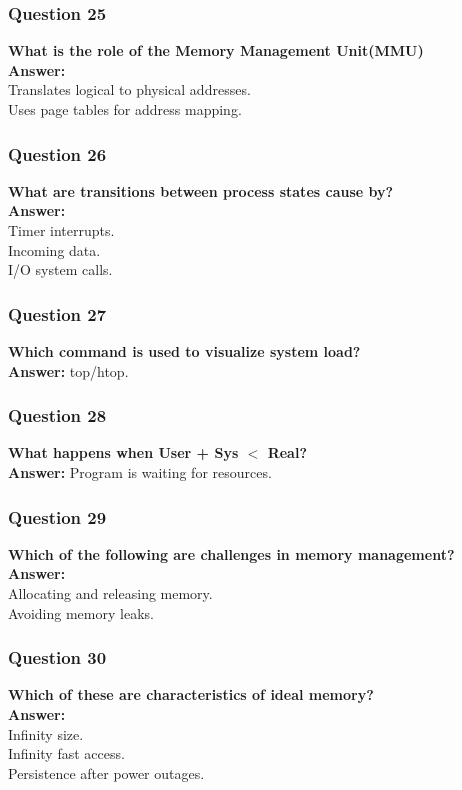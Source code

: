 \documentclass{article}
\begin{document}
\subsubsection*{Question 25}
\textbf{What is the role of the Memory Management Unit(MMU)} \\
\textbf{Answer:} \\ 
Translates logical to physical addresses. \\
Uses page tables for address mapping.

\subsubsection*{Question 26}
\textbf{What are transitions between process states cause by?} \\
\textbf{Answer:} \\
Timer interrupts. \\
Incoming data. \\
I/O system calls.

\subsubsection*{Question 27}
\textbf{Which command is used to visualize system load?} \\
\textbf{Answer:} top/htop.

\subsubsection*{Question 28}
\textbf{What happens when User + Sys $<$ Real?} \\
\textbf{Answer:} Program is waiting for resources.

\subsubsection*{Question 29}
\textbf{Which of the following are challenges in memory management?} \\
\textbf{Answer:} \\
Allocating and releasing memory. \\
Avoiding memory leaks.

\subsubsection*{Question 30}
\textbf{Which of these are characteristics of ideal memory?} \\
\textbf{Answer:} \\
Infinity size. \\
Infinity fast access. \\
Persistence after power outages.
\end{document}
